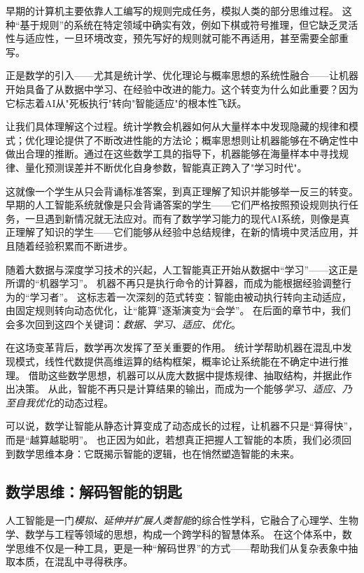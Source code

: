 早期的计算机主要依靠人工编写的规则完成任务，模拟人类的部分思维过程。
这种“基于规则”的系统在特定领域中确实有效，例如下棋或符号推理，但它缺乏灵活性与适应性，一旦环境改变，预先写好的规则就可能不再适用，甚至需要全部重写。  

正是数学的引入——尤其是统计学、优化理论与概率思想的系统性融合——让机器开始具备了从数据中学习、在经验中改进的能力。这个转变为什么如此重要？因为它标志着AI从"死板执行"转向"智能适应"的根本性飞跃。

让我们具体理解这个过程。统计学教会机器如何从大量样本中发现隐藏的规律和模式；优化理论提供了不断改进性能的方法论；概率思想则让机器能够在不确定性中做出合理的推断。通过在这些数学工具的指导下，机器能够在海量样本中寻找规律、量化预测误差并不断优化自身参数，智能真正跨入了"学习时代"。

这就像一个学生从只会背诵标准答案，到真正理解了知识并能够举一反三的转变。早期的人工智能系统就像是只会背诵答案的学生——它们严格按照预设规则执行任务，一旦遇到新情况就无法应对。而有了数学学习能力的现代AI系统，则像是真正理解了知识的学生——它们能够从经验中总结规律，在新的情境中灵活应用，并且随着经验积累而不断进步。

随着大数据与深度学习技术的兴起，人工智能真正开始从数据中“学习”——这正是所谓的“机器学习”。
机器不再只是执行命令的计算器，而成为能根据经验调整行为的“学习者”。
这标志着一次深刻的范式转变：智能由被动执行转向主动适应，由固定规则转向动态优化，让“能算”逐渐演变为“会学”。
在后面的章节中，我们会多次回到这四个关键词：\emph{数据、学习、适应、优化}。  

在这场变革背后，数学再次发挥了至关重要的作用。
统计学帮助机器在混乱中发现模式，线性代数提供高维运算的结构框架，概率论让系统能在不确定中进行推理。
借助这些数学思想，机器可以从庞大数据中提炼规律、抽取结构，并据此作出决策。
从此，智能不再只是计算结果的输出，而成为一个能够\emph{学习、适应、乃至自我优化}的动态过程。

可以说，数学让智能从静态计算变成了动态成长的过程，让机器不只是“算得快”，而是“越算越聪明”。
也正因为如此，若想真正把握人工智能的本质，我们必须回到数学思维本身：它既揭示智能的逻辑，也在悄然塑造智能的未来。  

\subsection{数学思维：解码智能的钥匙}
人工智能是一门\emph{模拟、延伸并扩展人类智能}的综合性学科，它融合了心理学、生物学、数学与工程等领域的思想，构成一个跨学科的智慧体系。
在这个体系中，数学思维不仅是一种工具，更是一种“解码世界”的方式——帮助我们从复杂表象中抽取本质，在混乱中寻得秩序。

